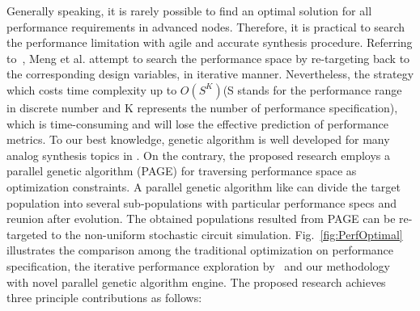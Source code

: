       Generally speaking, it is rarely possible to find an optimal solution for all performance requirements in advanced nodes. Therefore, it is practical to search the performance limitation with agile and accurate synthesis procedure. Referring to~\cite{PerfMap_ISQED2011}, Meng et al. attempt to search the performance space by re-targeting back to the corresponding design variables, in iterative manner. Nevertheless, the strategy which costs time complexity up to $O(S^K)$(S stands for the performance range in discrete number and K represents the number of performance specification), which is time-consuming and will lose the effective prediction of performance metrics. To our best knowledge, genetic algorithm is well developed for many analog synthesis topics in \cite{DARWIN_DAC1995,CAFFEINE_DATE2005,HeteroSyn_DATE2006,NominalYieldArea_AHS2009}. On the contrary, the proposed research employs a parallel genetic algorithm (PAGE) for traversing performance space as optimization constraints. A parallel genetic algorithm like \cite{SurveyPGA1997,SurveyDistPGA1997} can divide the target population into several sub-populations with particular performance specs and reunion after evolution. The obtained populations resulted from PAGE can be re-targeted to the non-uniform stochastic circuit simulation. Fig.~\ref{fig:PerfOptimal} illustrates the comparison among the traditional optimization on performance specification, the iterative performance exploration by~\cite{PerfMap_ISQED2011} and our methodology with novel parallel genetic algorithm engine. The proposed research achieves three principle contributions as follows: 
